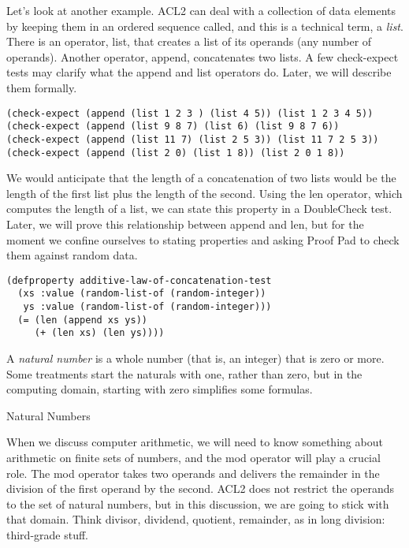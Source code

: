Let's look at another example.
ACL2 can deal with a collection of data elements
by keeping them in an ordered sequence called, 
and this is a technical term, a \emph{list}.
There is an operator, 
\label{list-op-informal}\textsf{list}, 
that creates a list of its operands
(any number of operands).
Another operator,
\label{append-op-informal}\textsf{append},
concatenates two lists.
A few \textsf{check-expect} tests may clarify 
what the \textsf{append} and \textsf{list} operators do.
Later, we will describe them formally.

\begin{Verbatim}
(check-expect (append (list 1 2 3 ) (list 4 5)) (list 1 2 3 4 5))
(check-expect (append (list 9 8 7) (list 6) (list 9 8 7 6))
(check-expect (append (list 11 7) (list 2 5 3)) (list 11 7 2 5 3))
(check-expect (append (list 2 0) (list 1 8)) (list 2 0 1 8))
\end{Verbatim}

We would anticipate that the length of a concatenation of two lists
would be the length of the first list plus the length of the second.
Using the 
\label{len-op-informal}\textsf{len}
operator, which computes the length of a list,
we can state this property in a DoubleCheck test.
Later, we will prove this relationship between \textsf{append} and \textsf{len},
but for the moment we confine ourselves to stating properties
and asking Proof Pad to check them against random data.

\label{additive-lengths-test}
\begin{Verbatim}
(defproperty additive-law-of-concatenation-test
  (xs :value (random-list-of (random-integer))
   ys :value (random-list-of (random-integer)))
  (= (len (append xs ys))
     (+ (len xs) (len ys))))
\end{Verbatim}

\begin{aside}
A \emph{natural number} is a whole number 
(that is, an integer) that is zero or more.
Some treatments start the naturals with one,
rather than zero, but in the computing domain,
starting with zero simplifies some formulas.
\caption{Natural Numbers}
\label{natural-number-def}
\end{aside}

When we discuss computer arithmetic, we will need to know something about
arithmetic on finite sets of numbers,  and the 
\label{mod-function}mod
operator will play a crucial role.
The mod operator takes two operands and
delivers the remainder in the division of the first operand by the second.
ACL2 does not restrict the operands to the set of natural numbers,
but in this discussion, we are going to stick with that domain.
Think
divisor, dividend, quotient, remainder,
as in
long division:
third-grade stuff.

